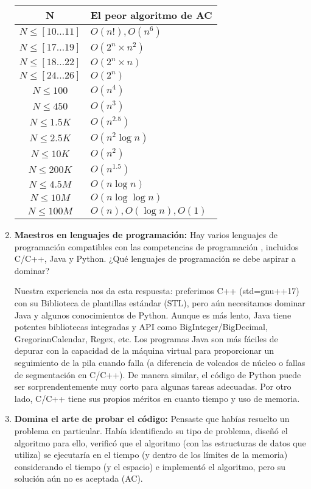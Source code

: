 \begin{enumerate}
	\begin{longtable}{|c|p{11cm}|}
		\hline
		\textbf{N} & \textbf{El peor algoritmo de AC} \\
		\hline
		 $N \le [10 \dots 11]$   &  $O(n!),O(n^{6})$  \\
		\hline
		  $ N \le [17 \dots 19]$   &  $O(2^{n} \times n^{2})$   \\
		\hline
		  $ N \le [18 \dots 22]$  &   $O(2^{n} \times n)$   \\
		\hline
		 $ N \le [24 \dots 26]$   &  $O(2^{n})$   \\
		\hline
		$ N \le 100$	&  $O(n^{4})$  \\
		\hline
		$ N \le 450$ &  $O(n^{3})$   \\
		\hline
		$ N \le 1.5K$    &   $O(n^{2.5})$  \\
		\hline
		$ N \le 2.5K$ &  $O(n^{2}\log n)$   \\
		\hline
		$ N \le 10K$ &  $O(n^{2})$  \\
		\hline
		$ N \le 200K$    &  $O(n^{1.5})$  \\
		\hline
		$ N \le 4.5M$ &  $O(n\log n)$   \\
		\hline
		$ N \le 10M$ &  $O(n \log \log n)$  \\
		\hline
		$ N \le 100M$ &  $O(n),O(\log n),O(1)$  \\
		\hline
	\end{longtable}
	
	\item \textbf{Maestros en lenguajes de programación:} Hay varios lenguajes de programación compatibles con las competencias de programación , incluidos C/C++, Java y Python. ¿Qué lenguajes de programación se debe aspirar a dominar? 
	
	Nuestra experiencia nos da esta respuesta: preferimos C++ (std=gnu++17) con su
	Biblioteca de plantillas estándar (STL), pero aún necesitamos dominar Java y algunos conocimientos
	de Python. Aunque es más lento, Java tiene potentes bibliotecas integradas y API como
	BigInteger/BigDecimal, GregorianCalendar, Regex, etc. Los programas Java son más fáciles de depurar
	con la capacidad de la máquina virtual para proporcionar un seguimiento de la pila cuando falla (a diferencia de volcados de núcleo o fallas de segmentación en C/C++). De manera similar, el código de Python puede ser sorprendentemente muy corto para algunas tareas adecuadas. Por otro lado, C/C++ tiene sus propios méritos en cuanto tiempo y uso de memoria.
	
	\item \textbf{Domina el arte de probar el código:} Pensaste que habías resuelto un problema en particular. Había identificado su tipo de problema, diseñó el algoritmo para ello, verificó que el algoritmo (con las estructuras de datos que utiliza) se ejecutaría en el tiempo (y dentro de los límites de la memoria) considerando el tiempo (y el espacio) e implementó el algoritmo, pero su solución aún no es aceptada (AC).
	

\end{enumerate}
